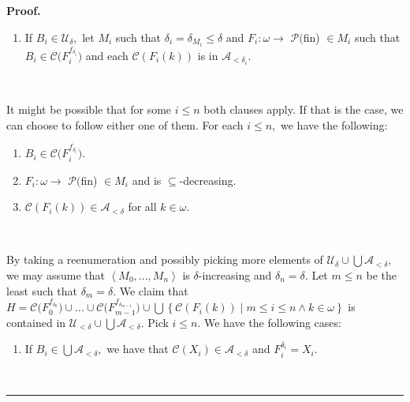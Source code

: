 \documentclass[10pt,a4paper]{amsart}
\newenvironment{proof}[1][Proof]{\noindent\textbf{#1.} }{\ \rule{0.5em}{0.5em}}
\begin{document}
\begin{proof}
\begin{enumerate}
\item If $B_{i}\in\mathcal{U}_{\delta},$ let $M_{i}$ such that $\delta
_{i}=\delta_{M_{i}}\leq\delta$ and $F_{i}:\omega\longrightarrow$
$\mathcal{P(}$\textsf{fin) }$\in M_{i}$ such that $B_{i}\in\mathcal{C(}%
F_{i}^{f_{\delta_{i}}})$ and each $\mathcal{C}\left(  F_{i}\left(  k\right)
\right)  $ is in $\mathcal{A}_{<\delta_{i}}.$
\end{enumerate}

\qquad\ \ 

It might be possible that for some $i\leq n$ both clauses apply. If that is
the case, we can choose to follow either one of them. For each $i\leq n,$ we
have the following:

\begin{enumerate}
\item $B_{i}\in\mathcal{C(}F_{i}^{f_{\delta_{i}}}).$

\item $F_{i}:\omega\longrightarrow$ $\mathcal{P(}$\textsf{fin) }$\in M_{i}$
and is $\subseteq$-decreasing$.$

\item $\mathcal{C}\left(  F_{i}\left(  k\right)  \right)  \in\mathcal{A}%
_{<\delta}$ for all $k\in\omega.$
\end{enumerate}

\qquad\ \ 

By taking a reenumeration and possibly picking more elements of $\mathcal{U}%
_{\delta}\cup%
{\textstyle\bigcup}
\mathcal{A}_{<\delta},$ we may assume that $\left\langle M_{0},...,M_{n}%
\right\rangle $ is $\delta$-increasing and $\delta_{n}=\delta.$ Let $m\leq n$
be the least such that $\delta_{m}=\delta.$ We claim that $H=\mathcal{C(}%
F_{0}^{f_{\delta_{0}}})\cup...\cup\mathcal{C(}F_{m-1}^{f_{\delta_{m-1}}})\cup%
{\textstyle\bigcup}
\left\{  \mathcal{C}\left(  F_{i}\left(  k\right)  \right)  \mid m\leq i\leq
n\wedge k\in\omega\right\}  $ is contained in $\mathcal{U}_{<\delta}\cup%
{\textstyle\bigcup}
\mathcal{A}_{<\delta}.$ Pick $i\leq n.$ We have the following cases:

\begin{enumerate}
\item If $B_{i}\in%
{\textstyle\bigcup}
\mathcal{A}_{<\delta},$ we have that $\mathcal{C}\left(  X_{i}\right)
\in\mathcal{A}_{<\delta}$ and $F_{i}^{\delta_{i}}=X_{i}$.


\end{enumerate}
\end{proof}
\end{document}
